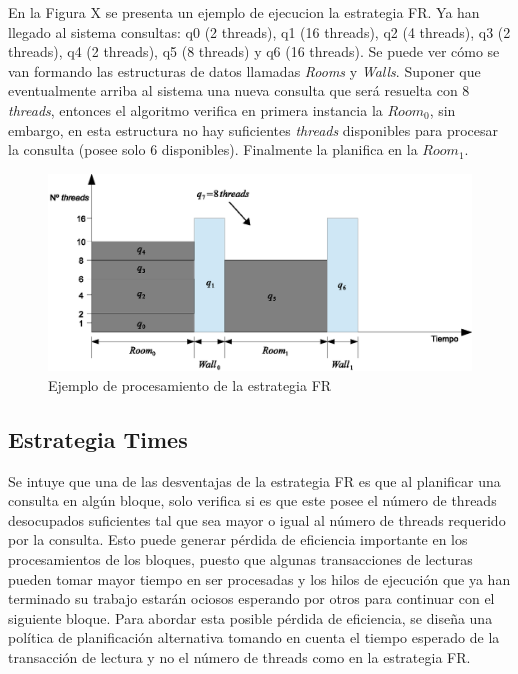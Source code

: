 En la Figura X se presenta un ejemplo de ejecucion la estrategia FR. Ya han llegado al sistema consultas: q0 (2 threads), q1 (16 threads), q2 (4 threads), q3 (2 threads), q4 (2 threads), q5 (8 threads) y q6 (16 threads). Se puede ver cómo se van formando las estructuras de datos llamadas \textit{Rooms} y \textit{Walls}. Suponer que eventualmente arriba al sistema una nueva consulta que será resuelta con 8 \textit{threads}, entonces el algoritmo verifica en primera instancia la $Room_0$, sin embargo, en esta estructura no hay suficientes \textit{threads} disponibles para procesar la consulta (posee solo 6 disponibles). Finalmente la planifica en la $Room_1$.

\begin{figure}[!th]
\centering
\includegraphics[scale=.75]{images/proceso_FR.eps}
\caption{Ejemplo de procesamiento de la estrategia FR}
\label{fig:proceso_FR}
\end{figure} 

\subsection{Estrategia Times}
\label{scheduling:times}
Se intuye que una de las desventajas de la estrategia FR es que al planificar una consulta en algún bloque, solo verifica si es que este posee el número de threads desocupados suficientes tal que sea mayor o igual al número de threads requerido por la consulta. Esto puede generar pérdida de eficiencia importante en los procesamientos de los bloques, puesto que algunas transacciones de lecturas pueden tomar mayor tiempo en ser procesadas y los hilos de ejecución que ya han terminado su trabajo estarán ociosos esperando por otros para continuar con el siguiente bloque. Para abordar esta posible pérdida de eficiencia, se diseña una política de planificación alternativa tomando en cuenta el tiempo esperado de la transacción de lectura y no el número de threads como en la estrategia FR.

